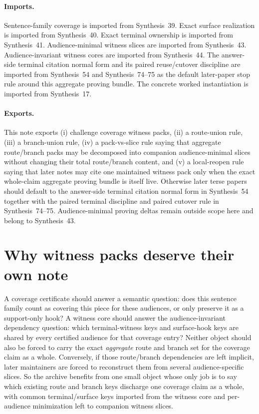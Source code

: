 \documentclass[11pt]{article}
\begin{document}
\paragraph{Imports.}
Sentence-family coverage is imported from Synthesis~39.\cite{series:challengecoverage}
Exact surface realization is imported from Synthesis~40.\cite{series:challengesurfacehooks}
Exact terminal ownership is imported from Synthesis~41.\cite{series:challengeterminalwitnesses}
Audience-minimal witness slices are imported from Synthesis~43.\cite{series:challengecoveragewitnessslices}
Audience-invariant witness cores are imported from Synthesis~44.\cite{series:challengecoveragewitnesscores}
The answer-side terminal citation normal form and its paired reuse/cutover discipline are imported from Synthesis~54 and Synthesis~74--75 as the default later-paper stop rule around this aggregate proving bundle.\cite{series:challengeanswerreviewmenus,series:pairedterminalcitationdiscipline,series:pairedterminalcutoverrules}
The concrete worked instantiation is imported from Synthesis~17.\cite{series:workedexample}
\paragraph{Exports.}
This note exports (i) challenge coverage witness packs, (ii) a route-union rule, (iii) a branch-union rule, (iv) a pack-vs-slice rule saying that aggregate route/branch packs may be decomposed into companion audience-minimal slices without changing their total route/branch content, and (v) a local-reopen rule saying that later notes may cite one maintained witness pack only when the exact whole-claim aggregate proving bundle is itself live.
Otherwise later terse papers should default to the answer-side terminal citation normal form in Synthesis~54 together with the paired terminal discipline and paired cutover rule in Synthesis~74--75. Audience-minimal proving deltas remain outside scope here and belong to Synthesis~43.\cite{series:challengecoveragewitnessslices,series:challengeanswerreviewmenus,series:pairedterminalcitationdiscipline,series:pairedterminalcutoverrules}
\section{Why witness packs deserve their own note}
A coverage certificate should answer a semantic question: does this sentence family count as covering this piece for these audiences, or only preserve it as a support-only hook?
A witness core should answer the audience-invariant dependency question: which terminal-witness keys and surface-hook keys are shared by every certified audience for that coverage entry?
Neither object should also be forced to carry the exact \emph{aggregate} route and branch set for the coverage claim as a whole.
Conversely, if those route/branch dependencies are left implicit, later maintainers are forced to reconstruct them from several audience-specific slices.
So the archive benefits from one small object whose only job is to say which existing route and branch keys discharge one coverage claim as a whole, with common terminal/surface keys imported from the witness core and per-audience minimization left to companion witness slices.
\end{document}
